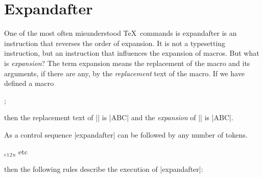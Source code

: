 \chapter{Expandafter}

One of the most often misunderstood \TeX\ commands is \cmd{\expandafter}
expandafter is an instruction that reverses the order of expansion. It is not a typesetting instruction, but an instruction that influences the expansion of macros. But what is \textit{expansion}? The term expansion means the replacement of the macro and its arguments, if there are any, by the \textit{replacement} text of the macro. If we have defined a macro

\begin{teX}
\def\test{ABC};
\end{teX}


\noindent then the replacement text of |\test| is |ABC| and the \textit{expansion} of |\test| is |ABC|.

As a control sequence |expandafter| can be followed by any number of tokens.

\begin{commands}[]{}
\cmd{\expandafter}\string\token$_e$\string\token$_1$\string\token$_2$\string\token$_n$ etc
\end{commands}

\noindent then the following rules describe the execution of |expandafter|:

